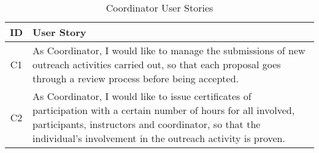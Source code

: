 \begin{table}[!htb]
  \centering
  \setlength{\aboverulesep}{0pt}
  \setlength{\belowrulesep}{0pt}
  \caption{Coordinator User Stories}
  \label{tab:coordinator-user-stories}
  \footnotesize
  \begin{tabularx}{\textwidth}{c|X}
    \toprule
    \rowcolor[rgb]{0.753,0.753,0.753} \textbf{ID} & \textbf{User Story}                    \\
    \hline
    \rowcolor[rgb]{0.898,0.898,0.898} C1          & As Coordinator, I would like to manage the submissions of new outreach activities carried out, so that each proposal goes through a review process before being accepted.                                           \\
    C2                                            & As Coordinator, I would like to issue certificates of participation with a certain number of hours for all involved, participants, instructors and coordinator, so that the individual's involvement in the outreach activity is proven.                                     \\
    \bottomrule
  \end{tabularx}
\end{table}